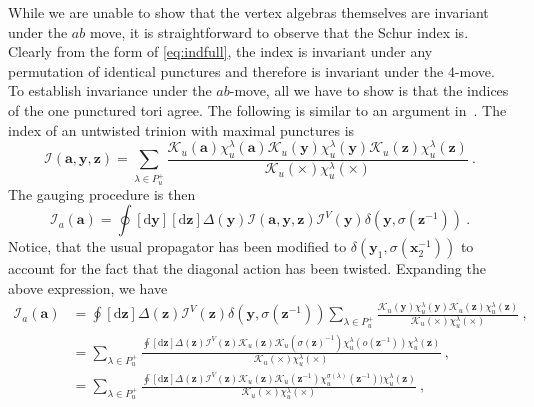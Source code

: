 \documentclass[a4paper]{article}
\begin{document}
While we are unable to show that the vertex algebras themselves are invariant under the $ab$ move, it is straightforward to observe that the Schur index is. Clearly from the form of \eqref{eq:indfull}, the index is invariant under any permutation of identical punctures and therefore is invariant under the $4$-move. To establish invariance under the $ab$-move, all we have to show is that the indices of the one punctured tori agree. The following is similar to an argument in~\cite{Agarwal:2013uga}. The index of an untwisted trinion with maximal punctures is
\begin{equation}
    \mathcal{I}(\mathbf{a},\mathbf{y},\mathbf{z}) = \sum_{\lambda\in P_{u}^+} \frac{\mathcal{K}_u(\mathbf{a})\chi^\lambda_u(\mathbf{a})\mathcal{K}_u(\mathbf{y})\chi^\lambda_u(\mathbf{y})\mathcal{K}_u(\mathbf{z})\chi^\lambda_u(\mathbf{z})}{\mathcal{K}_u(\times)\chi^\lambda_u(\times)}~.
\end{equation}
The gauging procedure is then
\begin{equation}
    \mathcal{I}_a(\mathbf{a}) = \oint [\mathrm{d}\mathbf{y}][\mathrm{d}\mathbf{z}]\Delta(\mathbf{y}) \mathcal{I}(\mathbf{a},\mathbf{y},\mathbf{z}) \mathcal{I}^V(\mathbf{y}) \delta(\mathbf{y},\sigma(\mathbf{z}^{-1}))~.
\end{equation}
Notice, that the usual propagator has been modified to $\delta(\mathbf{y}_1,\sigma(\mathbf{x}_2^{-1}))$ to account for the fact that the diagonal action has been twisted. Expanding the above expression, we have
\begin{equation}
\begin{split}
    \mathcal{I}_a(\mathbf{a}) &= \oint[\mathrm{d}\mathbf{z}]\Delta(\mathbf{z}) \mathcal{I}^V(\mathbf{z})\delta(\mathbf{y},\sigma(\mathbf{z}^{-1})) \sum_{\lambda\in P_u^+} \frac{ \mathcal{K}_{u}(\mathbf{y})\chi^{\lambda}_{u}(\mathbf{y})\mathcal{K}_{u}(\mathbf{z})\chi^{\lambda}_{u}(\mathbf{z})}{\mathcal{K}_{u}(\times)\chi^{\lambda}_{u}(\times)}~,\\
    &= \sum_{\lambda\in P_u^+}\frac{\oint[\mathrm{d}\mathbf{z}]\Delta(\mathbf{z}) \mathcal{I}^V(\mathbf{z}) \mathcal{K}_{u}(\mathbf{z})\mathcal{K}_{u}(\sigma(\mathbf{z})^{-1})\chi^{\lambda}_{u}(o(\mathbf{z}^{-1}))\chi^{\lambda}_{u}(\mathbf{z})}{\mathcal{K}_{u}(\times)\chi^{\lambda}_{u}(\times)}~,\\
    &= \sum_{\lambda\in P_u^+}\frac{\oint[\mathrm{d}\mathbf{z}]\Delta(\mathbf{z}) \mathcal{I}^V(\mathbf{z}) \mathcal{K}_{u}(\mathbf{z})\mathcal{K}_{u}(\mathbf{z}^{-1})\chi^{\sigma(\lambda)}_{u}(\mathbf{z}^{-1}))\chi^{\lambda}_{u}(\mathbf{z})}{\mathcal{K}_{u}(\times)\chi^{\lambda}_{u}(\times)}~,
    \end{split}
\end{equation}
\end{document}
